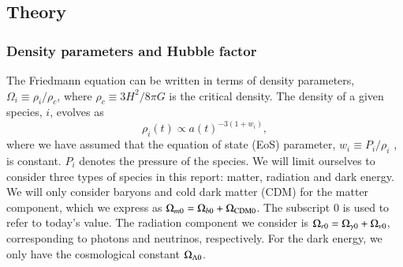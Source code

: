 

\subsection{Theory}\label{ssec:M1:theory}

\subsubsection{Density parameters and Hubble factor}

The Friedmann equation can be written in terms of density parameters, $\Omega_i\equiv \rho_i/\rho_c$, where $\rho_c\equiv 3H^2/8\pi G$ is the critical density. The density of a given species, $i$, evolves as \cite[Eq. (2.61)]{Dodelson}
\begin{equation}
    \rho_i(t)\propto a(t)^{-3(1+w_i)}, \label{eq:M1:theory:rho_i_eos_dependence}
\end{equation}
where we have assumed that the equation of state (EoS) parameter, $w_i \equiv P_i/\rho_i$ \citep[Eq. 2.60]{Dodelson}, is constant. $P_i$ denotes the pressure of the species. 
%
We will limit ourselves to consider three types of species in this report: matter, radiation and dark energy. We will only consider baryons and cold dark matter (CDM) for the matter component, which we express as $\Omega_{m0}=\Omega_{b0}+\Omega_\mathrm{CDM0}$. The subscript $0$ is used to refer to today's value. The radiation component we consider is $\Omega_{r0}=\Omega_{\gamma 0}+\Omega_{\nu 0}$, corresponding to photons and neutrinos, respectively. For the dark energy, we only have the cosmological constant $\Omega_{\Lambda 0}$.   

